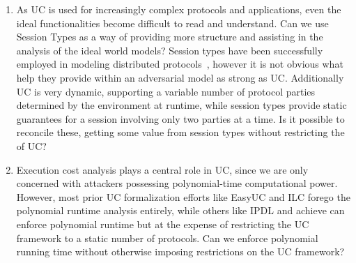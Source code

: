 \begin{enumerate}
\item 
As UC is used for increasingly complex protocols and applications, even the ideal functionalities become difficult to read and understand.
Can we use Session Types as a way of providing more structure and assisting in the analysis of the ideal world models?
Session types have been successfully employed in modeling distributed protocols~\cite{nomos}, however it is not obvious what help they provide within an adversarial model as strong as UC.
Additionally UC is very dynamic, supporting a variable number of protocol parties determined by the environment at runtime, while session types provide static guarantees for a session involving only two parties at a time.
Is it possible to reconcile these, getting some value from session types without restricting the  of UC?

\item Execution cost analysis plays a central role in UC, since we are only concerned with
attackers possessing polynomial-time computational power.
However, most prior UC formalization efforts like EasyUC and ILC forego the polynomial runtime analysis entirely, while others like IPDL and  achieve can enforce polynomial runtime but at the expense of restricting the UC framework to a static number of protocols.
Can we enforce polynomial running time without otherwise imposing restrictions on the UC framework?

\end{enumerate}

